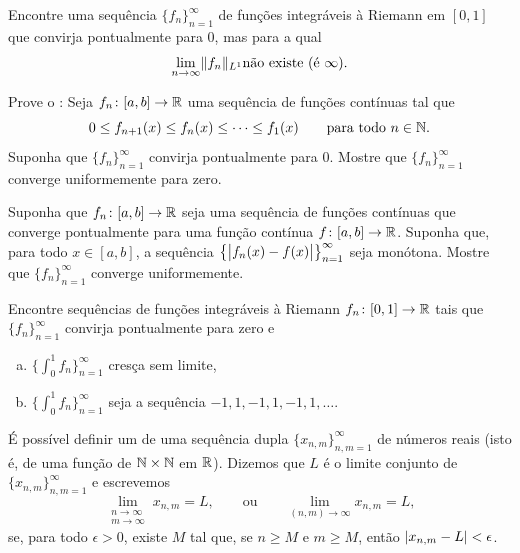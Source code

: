 \begin{exercise}
Encontre uma sequência $\{ f_n \}_{n=1}^\infty$ de funções integráveis à
Riemann em $[0,1]$ que convirja pontualmente para $0$, mas para a qual
\begin{equation*}
\lim_{n\to\infty} \lVert {f_n} \rVert_{L^1} \text{não existe (é } \infty\text{)}.
\end{equation*}
\end{exercise}

\begin{exercise}[Difícil] \label{exercise:dinisthm}
Prove o \emph{}:
Seja $f_n \colon [a,b] \to {\mathbb{R}}$ uma sequência de funções contínuas tal que
\begin{equation*}
0 \leq f_{n+1}(x) \leq f_n(x) \leq \cdots \leq f_1(x) 
\qquad \text{para todo } n \in {\mathbb{N}}.
\end{equation*}
Suponha que $\{ f_n \}_{n=1}^\infty$ convirja pontualmente para $0$.
Mostre que $\{ f_n \}_{n=1}^\infty$ converge uniformemente para zero.
\end{exercise}

\begin{exercise}
Suponha que $f_n \colon [a,b] \to {\mathbb{R}}$ seja uma sequência de funções
contínuas que converge pontualmente para uma função contínua
$f \colon [a,b] \to {\mathbb{R}}$. Suponha que, para todo $x \in [a,b]$, a
sequência $\bigl\{ \bigl\lvert {f_n(x)-f(x)} \bigr\rvert \bigr\}_{n=1}^\infty$ seja
monótona. Mostre que $\{f_n\}_{n=1}^\infty$ converge uniformemente.
\end{exercise}

\begin{exercise}
\pagebreak[3]
Encontre sequências de funções integráveis à Riemann
$f_n \colon [0,1] \to {\mathbb{R}}$ tais que $\{ f_n \}_{n=1}^\infty$ convirja
pontualmente para zero e
\begin{enumerate}[a)]
\item
$\bigl\{ \int_0^1 f_n \bigr\}_{n=1}^\infty$ cresça sem limite,
\item
$\bigl\{ \int_0^1 f_n \bigr\}_{n=1}^\infty$ seja a sequência $-1,1,-1,1,-1,1, \ldots$.
\end{enumerate}
\end{exercise}

\begin{exnote}
É possível definir um
\emph{} de uma sequência dupla
$\{ x_{n,m} \}_{n,m=1}^\infty$ de números reais (isto é, de uma função
de ${\mathbb{N}} \times {\mathbb{N}}$ em ${\mathbb{R}}$).
Dizemos que $L$ é o limite conjunto de $\{ x_{n,m} \}_{n,m=1}^\infty$ e escrevemos
\begin{equation*}
\lim_{\substack{n\to\infty\\m\to\infty}}
x_{n,m} = L ,
\qquad
\text{ou}
\qquad
\lim_{(n,m) \to \infty}
x_{n,m} = L ,
\end{equation*}
se, para todo $\epsilon > 0$, existe $M$ tal que, se $n \geq M$ e
$m \geq M$, então
$\lvert {x_{n,m} - L} \rvert < \epsilon$.
\end{exnote}

